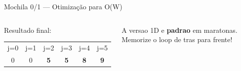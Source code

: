 \documentclass[aspectratio=169,10pt]{beamer}
\newcommand{\cDP}[1]{%
  \cellcolor{cellBase}\footnotesize #1}
\newcommand{\cDPh}[1]{%
  \cellcolor{cellHigh}\footnotesize\bfseries #1}
\begin{document}
\begin{frame}[fragile,shrink=3]{Mochila 0/1 --- Otimização para O(W)}
\begin{columns}[t]
\begin{tcolorbox}[caixaTeal,title={Visualização}]
        Resultado final:\\[3pt]
        \centering
        \begin{tabular}{cccccc}
          \scriptsize j=0 & \scriptsize j=1 & \scriptsize j=2 &
          \scriptsize j=3 & \scriptsize j=4 & \scriptsize j=5\\
          \cDP{0} & \cDP{0} & \cDPh{5} & \cDPh{5} & \cDPh{8} & \cDPh{9}\\
        \end{tabular}
      \end{tcolorbox}
      \vspace{0.08cm}
      \begin{tcolorbox}[caixaVerde,title={Uso em competicoes}]
        \footnotesize
        A versao 1D e \textbf{padrao} em maratonas.
        Memorize o loop de tras para frente!
      \end{tcolorbox}
  \end{columns}
\end{frame}
\end{document}
